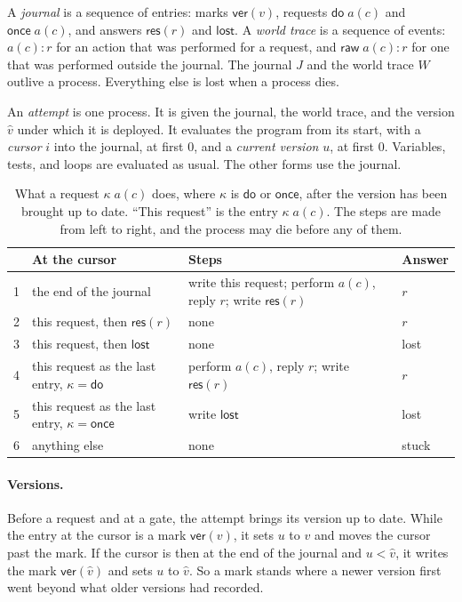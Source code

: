 \documentclass[acmsmall,nonacm,screen]{acmart}
\newcommand{\kw}[1]{\mathsf{#1}}
\newcommand{\res}[1]{\kw{res}(#1)}
\newcommand{\lost}{\kw{lost}}
\newcommand{\ver}[1]{\kw{ver}(#1)}
\begin{document}
A \emph{journal} is a sequence of entries: marks $\ver{v}$, requests $\kw{do}\;a(c)$ and
$\kw{once}\;a(c)$, and answers $\res{r}$ and $\lost$. A \emph{world trace} is a sequence of
events: $a(c){:}r$ for an action that was performed for a request, and $\kw{raw}\;a(c){:}r$
for one that was performed outside the journal. The journal $J$ and the world trace $W$
outlive a process. Everything else is lost when a process dies.

An \emph{attempt} is one process. It is given the journal, the world trace, and the version
$\hat v$ under which it is deployed. It evaluates the program from its start, with a
\emph{cursor} $i$ into the journal, at first $0$, and a \emph{current version} $u$, at first
$0$. Variables, tests, and loops are evaluated as usual. The other forms use the journal.

\begin{table}[t]
\caption{What a request $\kappa\;a(c)$ does, where $\kappa$ is $\kw{do}$ or $\kw{once}$,
after the version has been brought up to date. ``This request'' is the entry $\kappa\;a(c)$.
The steps are made from left to right, and the process may die before any of them.}
\label{tab:protocol}
\small
\begin{tabular}{@{}llll@{}}
\toprule
 & At the cursor & Steps & Answer \\
\midrule
1 & the end of the journal & write this request; perform $a(c)$, reply $r$; write $\res{r}$ & $r$ \\
2 & this request, then $\res{r}$ & none & $r$ \\
3 & this request, then $\lost$ & none & lost \\
4 & this request as the last entry, $\kappa = \kw{do}$ & perform $a(c)$, reply $r$; write $\res{r}$ & $r$ \\
5 & this request as the last entry, $\kappa = \kw{once}$ & write $\lost$ & lost \\
6 & anything else & none & stuck \\
\bottomrule
\end{tabular}
\end{table}

\paragraph{Versions.} Before a request and at a gate, the attempt brings its version up to
date. While the entry at the cursor is a mark $\ver{v}$, it sets $u$ to $v$ and moves the
cursor past the mark. If the cursor is then at the end of the journal and $u < \hat v$, it
writes the mark $\ver{\hat v}$ and sets $u$ to $\hat v$. So a mark stands where a newer
version first went beyond what older versions had recorded.
\end{document}

